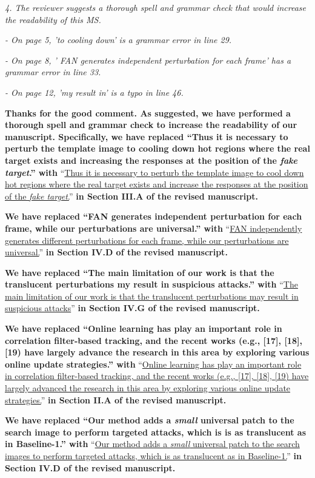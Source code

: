 \documentclass[12pt]{article}
\begin{document}
\textit{4. The reviewer suggests a thorough spell and grammar check that would increase the readability of this MS.}

\textit{- On page 5, 'to cooling down' is a grammar error in line 29.}

\textit{- On page 8, ' FAN generates independent perturbation for each frame' has a grammar error in line 33.}

\textit{- On page 12, 'my result in' is a typo in line 46.}

\textbf{Thanks for the good comment. As suggested, we have performed a thorough spell and grammar check to increase the readability of our manuscript. Specifically, we have replaced ``Thus it is necessary to perturb the template image to cooling down hot regions where the real target exists and increasing the responses at the position of the \textit{fake target}.'' with} ``\uline{Thus it is necessary to perturb the template image to cool down hot regions where the real target exists and increase the responses at the position of the \textit{fake target}.}''
\textbf{in Section III.A of the revised manuscript.}

\textbf{We have replaced ``FAN generates independent perturbation for each frame, while our perturbations are universal.'' with} ``\uline{FAN independently generates different perturbations for each frame, while our perturbations are universal.}'' \textbf{in Section IV.D of the revised manuscript.}

\textbf{We have replaced ``The main limitation of our work is that the translucent perturbations my result in suspicious attacks.'' with} ``\uline{The main limitation of our work is that the translucent perturbations may result in suspicious attacks}'' \textbf{in Section IV.G of the revised manuscript.}

\textbf{We have replaced ``Online learning has play an important role in correlation filter-based tracking, and the recent works (e.g., [17], [18], [19) have largely advance the research in this area by exploring various online update strategies.'' with} ``\uline{Online learning has play an important role in correlation filter-based tracking, and the recent works (e.g., [17], [18], [19) have largely advanced the research in this area by exploring various online update strategies.}'' \textbf{in Section II.A of the revised manuscript.}

\textbf{We have replaced ``Our method adds a \textit{small} universal patch to the search image to perform targeted attacks, which is is as translucent as in Baseline-1.'' with} ``\uline{Our method adds a \textit{small} universal patch to the search images to perform targeted attacks, which is as translucent as in Baseline-1.}'' \textbf{in Section IV.D of the revised manuscript.}
\end{document}
